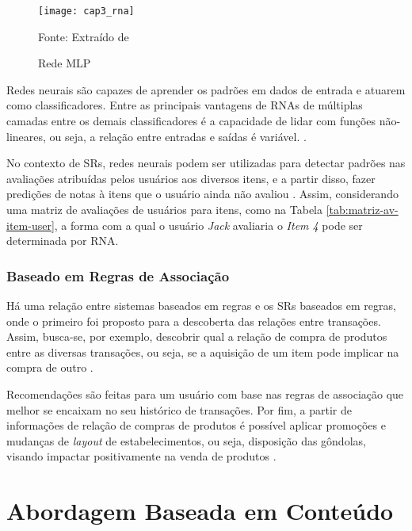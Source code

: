         \begin{figure}[htb]        
            \caption{Rede MLP}
            \texttt{[image: cap3\_rna]}
            \label{fig:cap3_rna}
            
            \footnotesize{Fonte: Extraído de }
        \end{figure}
        
        Redes neurais são capazes de aprender os padrões em dados de entrada e atuarem como classificadores. Entre as principais vantagens de RNAs de múltiplas camadas entre os demais classificadores é a capacidade de lidar com funções não-lineares, ou seja, a relação entre entradas e saídas é variável. \cite{Aggarwal2016}.
        
        No contexto de SRs, redes neurais podem ser utilizadas para detectar padrões nas avaliações atribuídas pelos usuários aos diversos itens, e a partir disso, fazer predições de notas à itens que o usuário ainda não avaliou \cite{Ricci2010}. Assim, considerando uma matriz de avaliações de usuários para itens, como na Tabela \ref{tab:matriz-av-item-user}, a forma com a qual o usuário \textit{Jack} avaliaria o \textit{Item 4} pode ser determinada por RNA.
         
        \ProximoForaDoSumario
        \subsubsection{Baseado em Regras de Associação}
        
        Há uma relação entre sistemas baseados em regras e os SRs baseados em regras, onde o primeiro foi proposto para a descoberta das relações entre transações. Assim, busca-se, por exemplo, descobrir qual a relação de compra de produtos entre as diversas transações, ou seja, se a aquisição de um item pode implicar na compra de outro \cite{Aggarwal2016}.  
        
        Recomendações são feitas para um usuário com base nas regras de associação que melhor se encaixam no seu histórico de transações.
        Por fim, a partir de informações de relação de compras de produtos é possível aplicar promoções e mudanças de \textit{layout} de estabelecimentos, ou seja, disposição das gôndolas, visando impactar positivamente na venda de produtos \cite{Jannach2010}.
            
\section{Abordagem Baseada em Conteúdo}

